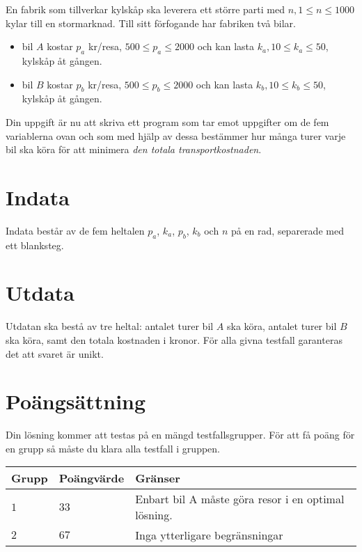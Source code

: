 
En fabrik som tillverkar kylskåp ska leverera ett större parti med $n, 1 \le n \le 1000$ kylar till en stormarknad. Till sitt förfogande har fabriken två bilar.

\begin{itemize}
\item bil $A$ kostar $p_a$ kr/resa, $500 \le p_a \le 2000$ och kan lasta $k_a, 10 \le k_a \le 50$, kylskåp åt gången.
\item bil $B$ kostar $p_b$ kr/resa, $500 \le p_b \le 2000$ och kan lasta $k_b, 10 \le k_b \le 50$, kylskåp åt gången.
\end{itemize}

Din uppgift är nu att skriva ett program som tar emot uppgifter om de fem variablerna ovan och som med hjälp av dessa bestämmer hur många turer varje bil ska köra för att minimera \emph{den totala transportkostnaden}.

\section*{Indata}
Indata består av de fem heltalen $p_a$, $k_a$, $p_b$, $k_b$ och $n$ på en rad, separerade med ett blanksteg.

\section*{Utdata}
Utdatan ska bestå av tre heltal: antalet turer bil $A$ ska köra, antalet turer bil $B$ ska köra, samt den totala kostnaden i kronor.
För alla givna testfall garanteras det att svaret är unikt.

\section*{Poängsättning}
Din lösning kommer att testas på en mängd testfallsgrupper.
För att få poäng för en grupp så måste du klara alla testfall i gruppen.

\noindent
\begin{tabular}{| l | l | l |}
  \hline
  Grupp & Poängvärde & Gränser \\ \hline
  $1$    & $33$        &  Enbart bil A måste göra resor i en optimal lösning. \\ \hline
  $2$    & $67$        &  Inga ytterligare begränsningar \\ \hline
\end{tabular}
